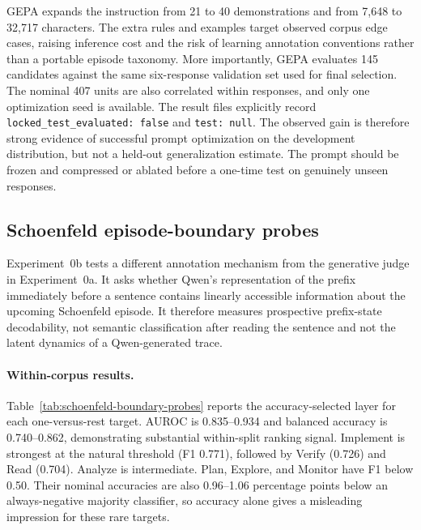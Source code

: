 \documentclass[manuscript,screen,review]{jair}
\begin{document}
GEPA expands the instruction from 21 to 40 demonstrations and from 7,648 to
32,717 characters.  The extra rules and examples target observed corpus edge
cases, raising inference cost and the risk of learning annotation conventions
rather than a portable episode taxonomy.  More importantly, GEPA evaluates
145 candidates against the same six-response validation set used for final
selection.  The nominal 407 units are also correlated within responses, and
only one optimization seed is available.  The result files explicitly record
\texttt{locked\_test\_evaluated: false} and \texttt{test: null}.  The observed
gain is therefore strong evidence of successful prompt optimization on the
development distribution, but not a held-out generalization estimate.  The
prompt should be frozen and compressed or ablated before a one-time test on
genuinely unseen responses.

\subsection{Schoenfeld episode-boundary probes}

Experiment~0b tests a different annotation mechanism from the generative
judge in Experiment~0a.  It asks whether Qwen's representation of the prefix
immediately before a sentence contains linearly accessible information about
the upcoming Schoenfeld episode.  It therefore measures prospective
prefix-state decodability, not semantic classification after reading the
sentence and not the latent dynamics of a Qwen-generated trace.

\paragraph{Within-corpus results.}
Table~\ref{tab:schoenfeld-boundary-probes} reports the accuracy-selected layer
for each one-versus-rest target.  AUROC is 0.835--0.934 and balanced accuracy
is 0.740--0.862, demonstrating substantial within-split ranking signal.
Implement is strongest at the natural threshold (F1 0.771), followed by
Verify (0.726) and Read (0.704).  Analyze is intermediate.  Plan, Explore, and
Monitor have F1 below 0.50.  Their nominal accuracies are also 0.96--1.06
percentage points below an always-negative majority classifier, so accuracy
alone gives a misleading impression for these rare targets.
\end{document}
